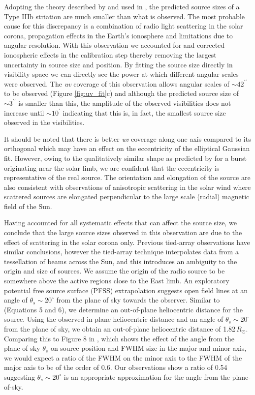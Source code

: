 Adopting the theory described by \cite{Takakura1975} and used in \cite{Kontar2017}, the predicted source sizes of a Type IIIb striation are much smaller than what is observed. The most probable cause for this discrepancy is a combination of radio light scattering in the solar corona, propagation effects in the Earth's ionosphere and limitations due to angular resolution.
With this observation we accounted for and corrected ionospheric effects in the calibration step \citep[Section \ref{sec:data} and ][]{DeGasperin2019} thereby removing the largest uncertainty in source size and position. By fitting the source size directly in visibility space we can directly see the power at which different angular scales were observed. The \textit{uv} coverage of this observation allows angular scales of ${\sim} 42^{\prime\prime}$ to be observed (Figure \ref{fig:uv_fit}c) and although the predicted source size of ${\sim}3^{\prime\prime}$ is smaller than this, the amplitude of the observed visibilities does not increase until ${\sim} 10^\prime$ indicating that this is, in fact, the smallest source size observed in the visibilities.

It should be noted that there is better \textit{uv} coverage along one axis compared to its orthogonal which may have an effect on the eccentricity of the elliptical Gaussian fit. However, owing to the qualitatively similar shape as predicted by \cite{Kontar2019} for a burst originating near the solar limb, we are confident that the eccentricity is representative of the real source. The orientation and elongation of the source are also consistent with observations of anisotropic scattering in the solar wind \citep{Anantharamaiah1994, Ingale2015} where scattered sources are elongated perpendicular to the large scale (radial) magnetic field of the Sun.

Having accounted for all systematic effects that can affect the source size, we conclude that the large source sizes observed in this observation are due to the effect of scattering in the solar corona only. Previous tied-array observations have similar conclusions, however the tied-array technique interpolates data from a tessellation of beams across the Sun, and this introduces an ambiguity to the origin and size of sources. 
We assume the origin of the radio source to be somewhere above the active regions close to the East limb. 
An exploratory potential free source surface (PFSS) extrapolation suggests open field lines at an angle of $ \theta_s {\sim} 20^\circ$ from the plane of sky towards the observer. Similar to \cite{Chrysaphi2018} (Equations 5 and 6), we determine an out-of-plane heliocentric distance for the source. Using the observed in-plane heliocentric distance and an angle of $ \theta_s {\sim} 20^\circ$ from the plane of sky, we obtain an out-of-plane heliocentric distance of 1.82$\, R_\odot$. Comparing this to Figure 8 in \cite{Kontar2019}, which shows the effect of the angle from the plane-of-sky $\theta_s$ on source position and FWHM size in the major and minor axis, we would expect a ratio of the FWHM on the minor axis to the FWHM of the major axis to be of the order of 0.6. Our observations show a ratio of 0.54 suggesting $ \theta_s {\sim} 20^\circ$ is an appropriate approximation for the angle from the plane-of-sky.

